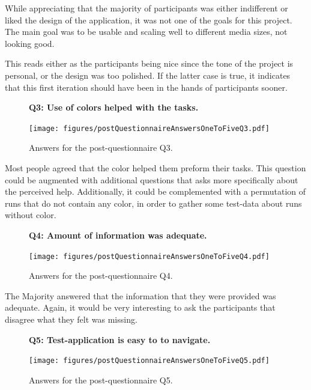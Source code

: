\documentclass[nofilelist,dvipsnames]{cslthse-msc}
\begin{document}
        While appreciating that the majority of participants was either
        indifferent or liked the design of the application, it was not one of
        the goals for this project. The main goal was to be usable and scaling
        well to different media sizes, not looking good.

        This reads either as the participants being nice since the tone of the
        project is personal, or the design was too polished. If the latter case
        is true, it indicates that this first iteration should have been in the
        hands of participants sooner.

				\begin{figure}[h!]
          \textbf{Q3: Use of colors helped with the tasks.}
          \begin{center}
            \texttt{[image: figures/postQuestionnaireAnswersOneToFiveQ3.pdf]}
            \vspace{-1cm}
            \caption{Answers for the post-questionnaire Q3.}
          \end{center}
				\end{figure}

        Most people agreed that the color helped them preform their tasks.
        This question could be augmented with additional questions that asks
        more specifically about the perceived help. Additionally, it could be
        complemented with a permutation of runs that do not contain any color,
        in order to gather some test-data about runs without color.

				\begin{figure}[h!]
          \textbf{Q4: Amount of information was adequate.}
          \begin{center}
            \texttt{[image: figures/postQuestionnaireAnswersOneToFiveQ4.pdf]}
            \vspace{-1cm}
            \caption{Answers for the post-questionnaire Q4.}
          \end{center}
				\end{figure}

        The Majority answered that the information that they were provided was
        adequate. Again, it would be very interesting to ask the participants
        that disagree what they felt was missing.

				\begin{figure}[h!]
          \textbf{Q5: Test-application is easy to to navigate.}
          \begin{center}
            \texttt{[image: figures/postQuestionnaireAnswersOneToFiveQ5.pdf]}
            \vspace{-1cm}
            \caption{Answers for the post-questionnaire Q5.}
          \end{center}
				\end{figure}
\end{document}
